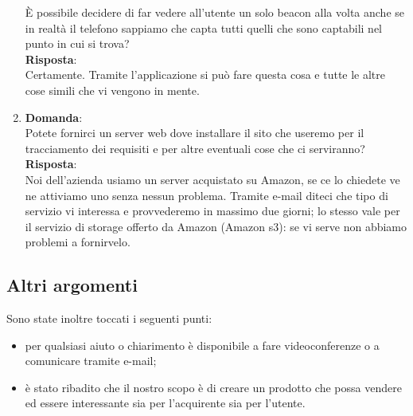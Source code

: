 \documentclass[a4paper,titlepage]{article}
\begin{document}
\begin{enumerate}
  È possibile decidere di far vedere all'utente un solo beacon alla volta anche se in realtà il telefono sappiamo che capta tutti quelli che sono captabili nel punto in cui si trova?\\
  \textbf{Risposta}: \\ 
  Certamente. Tramite l'applicazione si può fare questa cosa e tutte le altre cose simili che vi vengono in mente.
  \item \textbf{Domanda}:\\
  Potete fornirci un server web dove installare il sito che useremo per il tracciamento dei requisiti e per altre eventuali cose che ci serviranno?\\
  \textbf{Risposta}: \\
  Noi dell'azienda usiamo un server acquistato su Amazon, se ce lo chiedete ve ne attiviamo uno senza nessun problema. Tramite e-mail diteci che tipo di servizio vi interessa e provvederemo in massimo due giorni; lo stesso vale per il servizio di storage offerto da Amazon (Amazon s3): se vi serve non abbiamo problemi a fornirvelo.
\end{enumerate}

\subsection{Altri argomenti}
\label{sub:AltriArgomenti}

Sono state inoltre toccati i seguenti punti:

\begin{itemize}
  \item per qualsiasi aiuto o chiarimento \PROPONENTE {} è disponibile a fare videoconferenze o a comunicare tramite e-mail;
  \item è stato ribadito che il nostro scopo è di creare un prodotto che possa vendere ed essere interessante sia per l'acquirente sia per l'utente.
\end{itemize}
\end{document}
